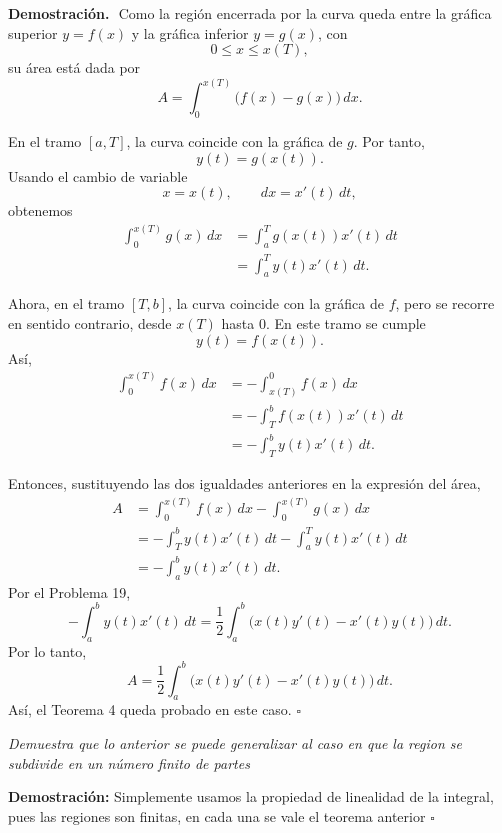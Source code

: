 \documentclass[11pt,letterpaper]{article}
\begin{document}
\textbf{Demostración.}\,\
Como la región encerrada por la curva queda entre la gráfica superior $y=f(x)$ y la gráfica inferior $y=g(x)$, con
\begin{equation*}
    0\leq x\leq x(T),
\end{equation*}
su área está dada por
\begin{equation*}
    A=\int_0^{x(T)}\bigl(f(x)-g(x)\bigr)\,dx.
\end{equation*}

En el tramo $[a,T]$, la curva coincide con la gráfica de $g$. Por tanto,
\begin{equation*}
    y(t)=g(x(t)).
\end{equation*}
Usando el cambio de variable
\begin{equation*}
    x=x(t),
    \qquad
    dx=x'(t)\,dt,
\end{equation*}
obtenemos
\begin{align*}
    \int_0^{x(T)}g(x)\,dx
    &=\int_a^T g(x(t))x'(t)\,dt\\
    &=\int_a^T y(t)x'(t)\,dt.
\end{align*}

Ahora, en el tramo $[T,b]$, la curva coincide con la gráfica de $f$, pero se recorre en sentido contrario, desde $x(T)$ hasta $0$. En este tramo se cumple
\begin{equation*}
    y(t)=f(x(t)).
\end{equation*}
Así,
\begin{align*}
    \int_0^{x(T)}f(x)\,dx
    &=-\int_{x(T)}^0 f(x)\,dx\\
    &=-\int_T^b f(x(t))x'(t)\,dt\\
    &=-\int_T^b y(t)x'(t)\,dt.
\end{align*}

Entonces, sustituyendo las dos igualdades anteriores en la expresión del área,
\begin{align*}
    A
      &=\int_0^{x(T)}f(x)\,dx-\int_0^{x(T)}g(x)\,dx\\
    &=-\int_T^b y(t)x'(t)\,dt-\int_a^T y(t)x'(t)\,dt\\
    &=-\int_a^b y(t)x'(t)\,dt.
\end{align*}
Por el Problema 19,
\begin{equation*}
    -\int_a^b y(t)x'(t)\,dt
    =
    \frac12\int_a^b\bigl(x(t)y'(t)-x'(t)y(t)\bigr)\,dt.
\end{equation*}
Por lo tanto,
\begin{equation*}
    A=
    \frac12\int_a^b\bigl(x(t)y'(t)-x'(t)y(t)\bigr)\,dt.
\end{equation*}
Así, el Teorema 4 queda probado en este caso.
\hfill $\square$
\begin{tcolorbox}[title=\textcolor{white}{Problema 22}]
\textit{Demuestra que lo anterior se puede generalizar al caso en que la region se subdivide en un n\'umero finito de partes}
\end{tcolorbox}
\textbf{Demostración:} Simplemente usamos la propiedad de linealidad de la integral, pues las regiones son finitas, en cada una se vale el teorema anterior 
\hfill $\square$
\end{document}
